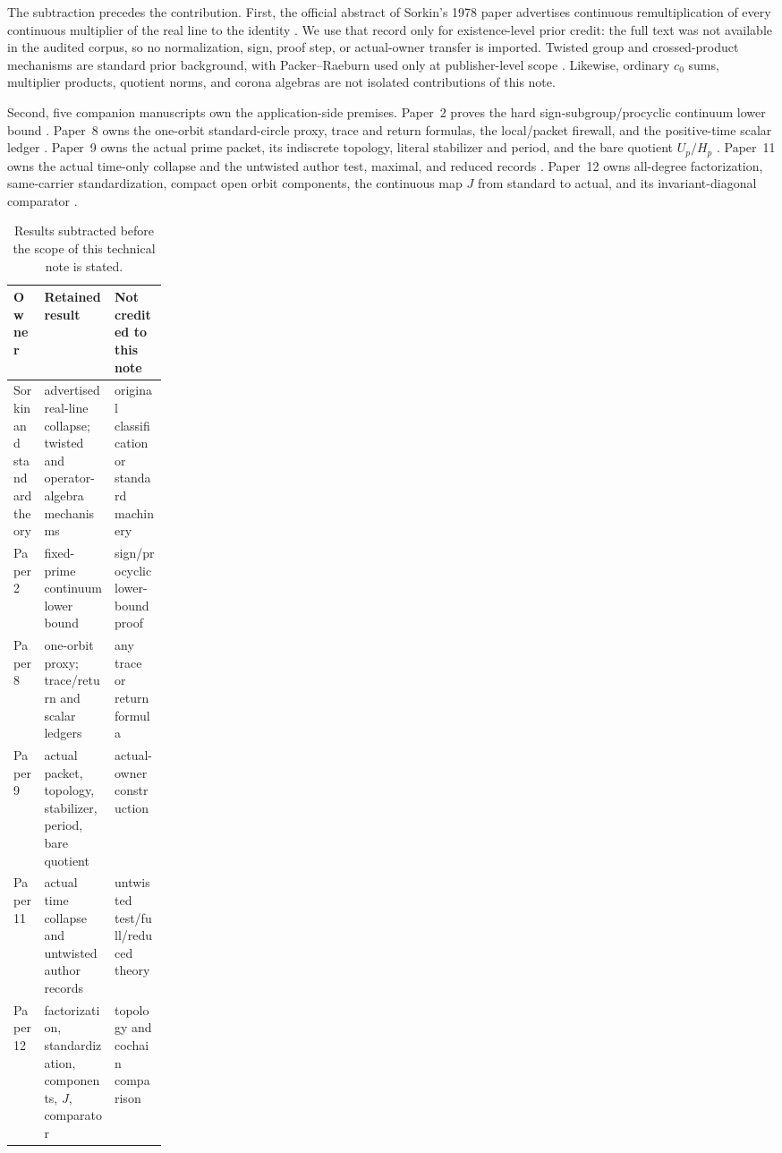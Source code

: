 \documentclass[11pt]{article}
\theoremstyle{definition}
\begin{document}
The subtraction precedes the contribution.  First, the official abstract of
Sorkin's 1978 paper advertises continuous remultiplication of every
continuous multiplier of the real line to the identity
\citep{Sorkin1978Triviality}.  We use that record only for existence-level
prior credit: the full text was not available in the audited corpus, so no
normalization, sign, proof step, or actual-owner transfer is imported.
Twisted group and crossed-product mechanisms are standard prior background,
with Packer--Raeburn used only at publisher-level scope
\citep{PackerRaeburn1989Twisted}.  Likewise, ordinary $c_0$ sums, multiplier
products, quotient norms, and corona algebras are not isolated contributions
of this note.

Second, five companion manuscripts own the application-side premises.
Paper~2 proves the hard sign-subgroup/procyclic continuum lower bound
\citep[Proposition \texttt{prop:uncountable}]{Wang2026ArithmeticPeriodPackets}.
Paper~8 owns the one-orbit standard-circle proxy, trace and return formulas,
the local/packet firewall, and the positive-time scalar ledger
\citep{Wang2026IsotropyAveraging}.  Paper~9 owns the actual prime packet, its
indiscrete topology, literal stabilizer and period, and the bare quotient
$U_p/H_p$ \citep[Corollaries \texttt{cor:packet} and
\texttt{cor:orbit}]{Wang2026PacketSeparation}.  Paper~11 owns the actual
time-only collapse and the untwisted author test, maximal, and reduced
records \citep[Theorems \texttt{thm:phi}, \texttt{thm:star-algebra}, and
\texttt{thm:completions}]{Wang2026ContinuousConvolution}.  Paper~12 owns
all-degree factorization, same-carrier standardization, compact open orbit
components, the continuous map $J$ from standard to actual, and its
invariant-diagonal comparator \citep[Theorem \texttt{thm:factorization} and
Corollary \texttt{cor:packet-comparison}]{Wang2026MarkedTime}.

\begin{table}[t]
\centering
\caption{Results subtracted before the scope of this technical note is stated.}
\label{tab:prior-subtraction}
\small
\begin{tabularx}{\linewidth}{P{0.20\linewidth}YY}
\toprule
Owner & Retained result & Not credited to this note \\
\midrule
Sorkin and standard theory & advertised real-line collapse; twisted and
operator-algebra mechanisms & original classification or standard machinery \\
Paper 2 & fixed-prime continuum lower bound & sign/procyclic lower-bound proof \\
Paper 8 & one-orbit proxy; trace/return and scalar ledgers & any trace or return formula \\
Paper 9 & actual packet, topology, stabilizer, period, bare quotient & actual-owner construction \\
Paper 11 & actual time collapse and untwisted author records & untwisted test/full/reduced theory \\
Paper 12 & factorization, standardization, components, $J$, comparator & topology and cochain comparison \\
\bottomrule
\end{tabularx}
\end{table}
\end{document}
